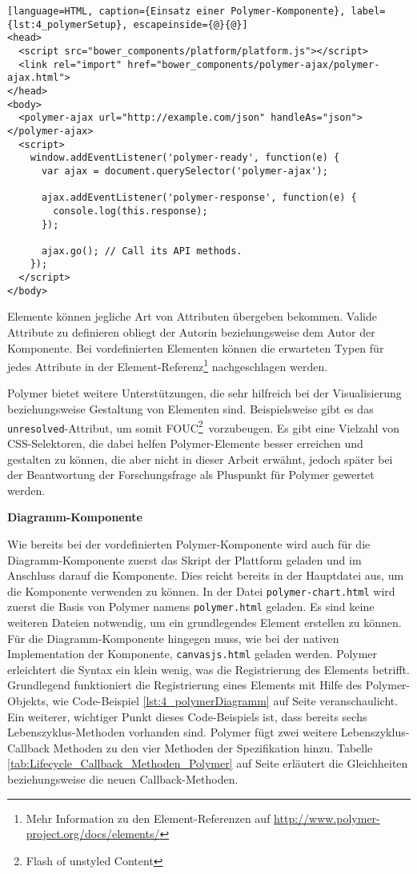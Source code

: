 \begin{lstlisting}[language=HTML, caption={Einsatz einer Polymer-Komponente}, label={lst:4_polymerSetup}, escapeinside={@}{@}]
<head>
  <script src="bower_components/platform/platform.js"></script>
  <link rel="import" href="bower_components/polymer-ajax/polymer-ajax.html">
</head>
<body>
  <polymer-ajax url="http://example.com/json" handleAs="json"></polymer-ajax>
  <script>
    window.addEventListener('polymer-ready', function(e) {
      var ajax = document.querySelector('polymer-ajax');

      ajax.addEventListener('polymer-response', function(e) {
        console.log(this.response);
      });

      ajax.go(); // Call its API methods.
    });
  </script>
</body>
\end{lstlisting}

Elemente können jegliche Art von Attributen übergeben bekommen. Valide Attribute zu definieren obliegt der Autorin beziehungsweise dem Autor der Komponente. Bei vordefinierten Elementen können die erwarteten Typen für jedes Attribute in der Element-Referenz\footnote{Mehr Information zu den Element-Referenzen auf \url{http://www.polymer-project.org/docs/elements/}} nachgeschlagen werden.

Polymer bietet weitere Unterstützungen, die sehr hilfreich bei der Visualisierung beziehungsweise Gestaltung von Elementen sind. Beispielsweise gibt es das \lstinline|unresolved|-Attribut, um somit \glqq FOUC\footnote{Flash of unstyled Content}\grqq\ vorzubeugen. Es gibt eine Vielzahl von CSS-Selektoren, die dabei helfen Polymer-Elemente besser erreichen und gestalten zu können, die aber nicht in dieser Arbeit erwähnt, jedoch später bei der Beantwortung der Forschungsfrage als Pluspunkt für Polymer gewertet werden.

\textbf{Diagramm-Komponente}

Wie bereits bei der vordefinierten Polymer-Komponente wird auch für die Diagramm-Komponente zuerst das Skript der Plattform geladen und im Anschluss darauf die Komponente. Dies reicht bereits in der Hauptdatei aus, um die Komponente verwenden zu können. In der Datei \lstinline|polymer-chart.html| wird zuerst die Basis von Polymer namens \lstinline|polymer.html| geladen. Es sind keine weiteren Dateien notwendig, um ein grundlegendes Element erstellen zu können. Für die Diagramm-Komponente hingegen muss, wie bei der nativen Implementation der Komponente, \lstinline|canvasjs.html| geladen werden. Polymer erleichtert die Syntax ein klein wenig, was die Registrierung des Elements betrifft. Grundlegend funktioniert die Registrierung eines Elements mit Hilfe des Polymer-Objekts, wie Code-Beispiel \ref{lst:4_polymerDiagramm} auf Seite \pageref{lst:4_polymerDiagramm} veranschaulicht. Ein weiterer, wichtiger Punkt dieses Code-Beispiels ist, dass bereits sechs Lebenszyklus-Methoden vorhanden sind. Polymer fügt zwei weitere Lebenszyklus-Callback Methoden zu den vier Methoden der Spezifikation hinzu. Tabelle \ref{tab:Lifecycle_Callback_Methoden_Polymer} auf Seite \pageref{tab:Lifecycle_Callback_Methoden_Polymer} erläutert die Gleichheiten beziehungsweise die neuen Callback-Methoden.

